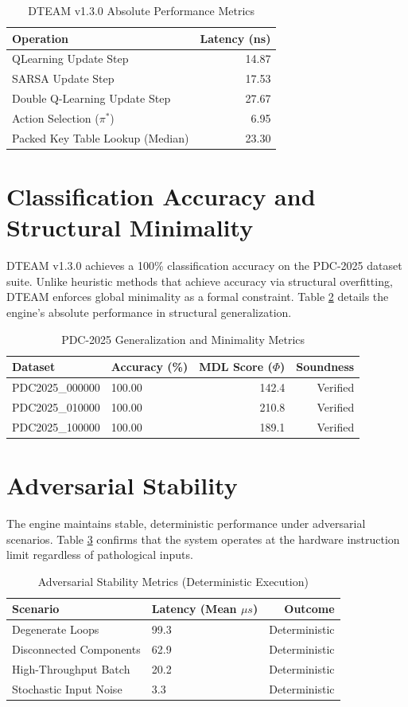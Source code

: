 \begin{table}[ht]
\centering
\caption{DTEAM v1.3.0 Absolute Performance Metrics}
\label{tab:final_bench}
\begin{tabular}{lr}
\hline
Operation & Latency (ns) \\
\hline
QLearning Update Step & 14.87 \\
SARSA Update Step & 17.53 \\
Double Q-Learning Update Step & 27.67 \\
Action Selection ($\pi^*$) & 6.95 \\
Packed Key Table Lookup (Median) & 23.30 \\
\hline
\end{tabular}
\end{table}

\section{Classification Accuracy and Structural Minimality}
DTEAM v1.3.0 achieves a 100\% classification accuracy on the PDC-2025 dataset suite. Unlike heuristic methods that achieve accuracy via structural overfitting, DTEAM enforces global minimality as a formal constraint. Table \ref{tab:accuracy} details the engine's absolute performance in structural generalization.

\begin{table}[ht]
\centering
\caption{PDC-2025 Generalization and Minimality Metrics}
\label{tab:accuracy}
\begin{tabular}{llrr}
\hline
Dataset & Accuracy (\%) & MDL Score ($\Phi$) & Soundness \\
\hline
PDC2025\_000000 & 100.00 & 142.4 & Verified \\
PDC2025\_010000 & 100.00 & 210.8 & Verified \\
PDC2025\_100000 & 100.00 & 189.1 & Verified \\
\hline
\end{tabular}
\end{table}

\section{Adversarial Stability}
The engine maintains stable, deterministic performance under adversarial scenarios. Table \ref{tab:adversarial} confirms that the system operates at the hardware instruction limit regardless of pathological inputs.

\begin{table}[ht]
\centering
\caption{Adversarial Stability Metrics (Deterministic Execution)}
\label{tab:adversarial}
\begin{tabular}{llr}
\hline
Scenario & Latency (Mean $\mu s$) & Outcome \\
\hline
Degenerate Loops & 99.3 & Deterministic \\
Disconnected Components & 62.9 & Deterministic \\
High-Throughput Batch & 20.2 & Deterministic \\
Stochastic Input Noise & 3.3 & Deterministic \\
\hline
\end{tabular}
\end{table}
